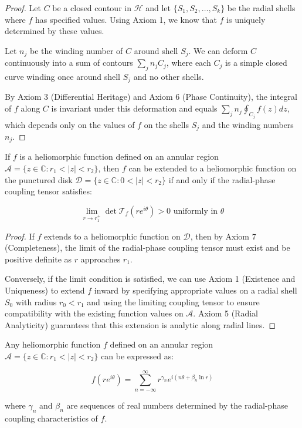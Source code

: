\begin{proof}
Let $C$ be a closed contour in $\mathcal{H}$ and let $\{S_1, S_2, \ldots, S_k\}$ be the radial shells where $f$ has specified values. Using Axiom 1, we know that $f$ is uniquely determined by these values.

Let $n_j$ be the winding number of $C$ around shell $S_j$. We can deform $C$ continuously into a sum of contours $\sum_j n_j C_j$, where each $C_j$ is a simple closed curve winding once around shell $S_j$ and no other shells.

By Axiom 3 (Differential Heritage) and Axiom 6 (Phase Continuity), the integral of $f$ along $C$ is invariant under this deformation and equals $\sum_j n_j \oint_{C_j} f(z) dz$, which depends only on the values of $f$ on the shells $S_j$ and the winding numbers $n_j$.
\end{proof}

\begin{theorem}
If $f$ is a heliomorphic function defined on an annular region $\mathcal{A} = \{z \in \mathbb{C} : r_1 < |z| < r_2\}$, then $f$ can be extended to a heliomorphic function on the punctured disk $\mathcal{D} = \{z \in \mathbb{C} : 0 < |z| < r_2\}$ if and only if the radial-phase coupling tensor satisfies:

\begin{equation}
\lim_{r \to r_1^+} \det\mathcal{T}_f(re^{i\theta}) > 0 \text{ uniformly in } \theta
\end{equation}
\end{theorem}

\begin{proof}
If $f$ extends to a heliomorphic function on $\mathcal{D}$, then by Axiom 7 (Completeness), the limit of the radial-phase coupling tensor must exist and be positive definite as $r$ approaches $r_1$.

Conversely, if the limit condition is satisfied, we can use Axiom 1 (Existence and Uniqueness) to extend $f$ inward by specifying appropriate values on a radial shell $S_0$ with radius $r_0 < r_1$ and using the limiting coupling tensor to ensure compatibility with the existing function values on $\mathcal{A}$. Axiom 5 (Radial Analyticity) guarantees that this extension is analytic along radial lines.
\end{proof}

\begin{theorem}
Any heliomorphic function $f$ defined on an annular region $\mathcal{A} = \{z \in \mathbb{C} : r_1 < |z| < r_2\}$ can be expressed as:

\begin{equation}
f(re^{i\theta}) = \sum_{n=-\infty}^{\infty} r^{\gamma_n} e^{i(n\theta + \beta_n \ln r)}
\end{equation}

where $\gamma_n$ and $\beta_n$ are sequences of real numbers determined by the radial-phase coupling characteristics of $f$.
\end{theorem}

